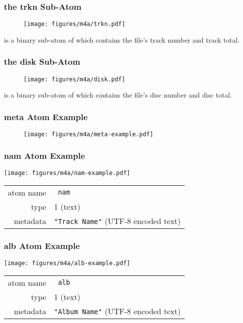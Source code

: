\clearpage

\subsubsection{the trkn Sub-Atom}
\begin{figure}[h]
\texttt{[image: figures/m4a/trkn.pdf]}
\end{figure}
\par
\noindent
{} is a binary sub-atom of  which contains
the file's track number and track total.

\subsubsection{the disk Sub-Atom}
\begin{figure}[h]
\texttt{[image: figures/m4a/disk.pdf]}
\end{figure}
\par
\noindent
{} is a binary sub-atom of  which contains
the file's disc number and disc total.

\clearpage

\subsubsection{meta Atom Example}
\begin{figure}[h]
\texttt{[image: figures/m4a/meta-example.pdf]}
\end{figure}

\clearpage

\subsubsection{nam Atom Example}
\texttt{[image: figures/m4a/nam-example.pdf]}
\par
\noindent
\begin{tabular}{rl}
  \textsf{atom name} & \texttt{ nam} \\
  \textsf{type} & 1 (text) \\
  \textsf{metadata} & \texttt{"Track Name"} (UTF-8 encoded text) \\
\end{tabular}

\subsubsection{alb Atom Example}
\texttt{[image: figures/m4a/alb-example.pdf]}
\par
\noindent
\begin{tabular}{rl}
  \textsf{atom name} & \texttt{ alb} \\
  \textsf{type} & 1 (text) \\
  \textsf{metadata} & \texttt{"Album Name"} (UTF-8 encoded text) \\
\end{tabular}


